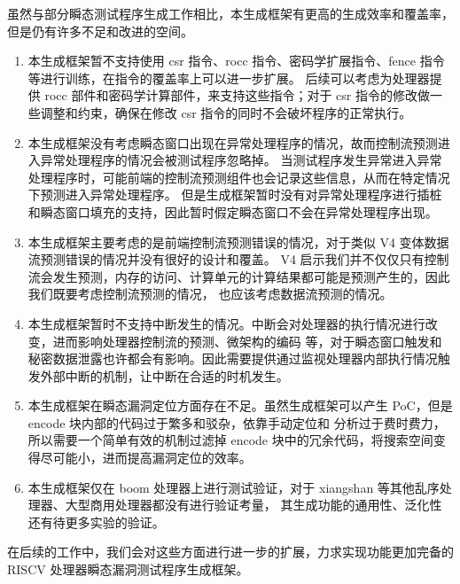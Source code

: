 虽然与部分瞬态测试程序生成工作相比，本生成框架有更高的生成效率和覆盖率，但是仍有许多不足和改进的空间。\par

\begin{enumerate}
    \item 本生成框架暂不支持使用 csr 指令、rocc 指令、密码学扩展指令、fence 指令等进行训练，在指令的覆盖率上可以进一步扩展。
后续可以考虑为处理器提供 rocc 部件和密码学计算部件，来支持这些指令；对于 csr 指令的修改做一些调整和约束，确保在修改 csr
指令的同时不会破坏程序的正常执行。\par
    \item 本生成框架没有考虑瞬态窗口出现在异常处理程序的情况，故而控制流预测进入异常处理程序的情况会被测试程序忽略掉。
当测试程序发生异常进入异常处理程序时，可能前端的控制流预测组件也会记录这些信息，从而在特定情况下预测进入异常处理程序。
但是生成框架暂时没有对异常处理程序进行插桩和瞬态窗口填充的支持，因此暂时假定瞬态窗口不会在异常处理程序出现。\par
    \item 本生成框架主要考虑的是前端控制流预测错误的情况，对于类似 V4 变体数据流预测错误的情况并没有很好的设计和覆盖。
V4 启示我们并不仅仅只有控制流会发生预测，内存的访问、计算单元的计算结果都可能是预测产生的，因此我们既要考虑控制流预测的情况，
也应该考虑数据流预测的情况。\par
    \item 本生成框架暂时不支持中断发生的情况。中断会对处理器的执行情况进行改变，进而影响处理器控制流的预测、微架构的编码
等，对于瞬态窗口触发和秘密数据泄露也许都会有影响。因此需要提供通过监视处理器内部执行情况触发外部中断的机制，让中断在合适的时机发生。\par
    \item 本生成框架在瞬态漏洞定位方面存在不足。虽然生成框架可以产生 PoC，但是 encode 块内部的代码过于繁多和驳杂，依靠手动定位和
分析过于费时费力，所以需要一个简单有效的机制过滤掉 encode 块中的冗余代码，将搜索空间变得尽可能小，进而提高漏洞定位的效率。\par
    \item 本生成框架仅在 boom 处理器上进行测试验证，对于 xiangshan 等其他乱序处理器、大型商用处理器都没有进行验证考量，
其生成功能的通用性、泛化性还有待更多实验的验证。\par
\end{enumerate}

在后续的工作中，我们会对这些方面进行进一步的扩展，力求实现功能更加完备的 RISCV 处理器瞬态漏洞测试程序生成框架。\par


